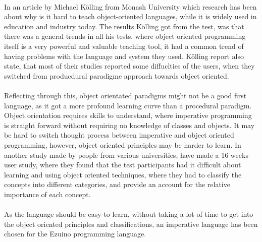 \\
In an article by Michael Kölling from Monash University which research has been about why is it hard to teach object-oriented languages, while it is widely used in education and industry today. The results Kölling got from the test, was that there was a general trends in all his tests, where object oriented programming itself is a very powerful and valuable teaching tool, it had a common trend of having problems with the language and system they used. Kölling report also state, that most of their studies reported some diffuclties of the users, when they switched from producdural paradigme approach towards object oriented.\cite{fuk1} \\
\\
Reflecting through this, object orientated paradigms might not be a good first language, as it got a more profound learning curve than a procedural paradigm. Object orientation requires skills to understand, where imperative programming is straight forward without requiring no knowledge of classes and objects. It may be hard to switch thought process between imperative and object oriented programming, however, object oriented principles may be harder to learn. In another study made by people from various universities\cite{fuk2}, have made a 16 weeks user study, where they found that the test participants had it difficult about learning and using object oriented techniques, where they had to classify the concepts into different categories, and provide an account for the relative importance of each concept.\\
\\
As the language should be easy to learn, without taking a lot of time to get into the object oriented principles and classifications, an imperative language has been chosen for the Ezuino programming language.